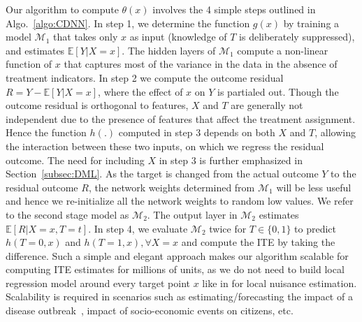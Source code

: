 \documentclass[sigconf]{acmart}
\newcommand{\eat}[1]{}
\theoremstyle{plain}
\numberwithin{equation}{section}
\begin{document}
Our algorithm to compute $\theta(x)$ involves the 4 simple steps outlined in Algo.~\ref{algo:CDNN}. In step 1, we determine the function $g(x)$ by training a model $\mathcal{M}_1$ that takes only $x$ as input (knowledge of $T$ is deliberately suppressed), and estimates $\mathbb{E}[Y|X=x]$. The hidden layers of $\mathcal{M}_1$ compute a non-linear function of $x$ that captures most of the variance in the data in the absence of treatment indicators.\eat{We tune $\mathcal{M}_1$ on out-of-sample validation data to make sure we are not over-fitting to noises. The tuning involves selection of various parameters such as the number of hidden layers, hidden units, choice of activation functions at hidden \& output layers, learning rate, learning rate decay, number of iterations, batch size, regularization parameter, optimization function, etc.} In step 2 we compute the outcome residual $R = Y - \mathbb{E}[Y|X=x]$, where the effect of $x$ on $Y$ is partialed out. Though the outcome residual is orthogonal to features, $X$ and $T$ are generally not independent due to the presence of features that affect the treatment assignment. Hence the function $h(.)$ computed in step 3 depends on both $X$ and $T$, allowing the interaction between these two inputs, on which we regress the residual outcome. The need for including $X$ in step 3 is further emphasized in Section~\ref{subsec:DML}. As the target is changed from the actual outcome $Y$ to the residual outcome $R$, the network weights determined from $\mathcal{M}_1$ will be less useful and hence we re-initialize all the network weights to random low values. We refer to the second stage model as $\mathcal{M}_2$. The output layer in $\mathcal{M}_2$ estimates $\mathbb{E}[R|X=x, T=t]$. In step 4, we evaluate $\mathcal{M}_2$ twice for $T \in \{0,1\}$ to predict $h(T=0,x)$ and $h(T=1,x), \forall X=x$ and compute the ITE by taking the difference. Such a simple and elegant approach makes our algorithm scalable for computing ITE estimates for millions of units, as we do not need to build local regression model around every target point $x$ like in \cite{OrthogonalRandomForest} for local nuisance estimation. Scalability is required in scenarios such as estimating/forecasting the impact of a disease outbreak~\cite{causalityEpidemic}, impact of socio-economic events on citizens, etc.

\eat{ a scenario encountered routinely in large scale  e-commerce companies where causal effects are computed for different treatments like product purchases, suppression of cash on delivery, product damages due to poor packaging etc. on customer's future engagement with the company.}
\end{document}
